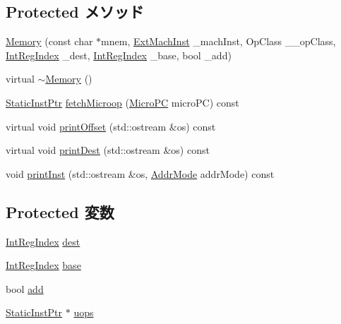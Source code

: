 \subsection*{Protected メソッド}
\begin{DoxyCompactItemize}
\item 
\hyperlink{classArmISA_1_1Memory_afe107d6d2ae3ba3d801594034a8b25ca}{Memory} (const char $\ast$mnem, \hyperlink{classStaticInst_a5605d4fc727eae9e595325c90c0ec108}{ExtMachInst} \_\-machInst, OpClass \_\-\_\-opClass, \hyperlink{namespaceArmISA_ae64680ba9fb526106829d6bf92fc791b}{IntRegIndex} \_\-dest, \hyperlink{namespaceArmISA_ae64680ba9fb526106829d6bf92fc791b}{IntRegIndex} \_\-base, bool \_\-add)
\item 
virtual \hyperlink{classArmISA_1_1Memory_a9c1fdd45550b31acf896fea338961fc1}{$\sim$Memory} ()
\item 
\hyperlink{classRefCountingPtr}{StaticInstPtr} \hyperlink{classArmISA_1_1Memory_ae9e7acd6304ee397f1ab470e283ae76b}{fetchMicroop} (\hyperlink{base_2types_8hh_adfb4d8b20c5abc8be73dd367b16f2d57}{MicroPC} microPC) const 
\item 
virtual void \hyperlink{classArmISA_1_1Memory_a8ff7c6b5299bfe7b627754684ca9c387}{printOffset} (std::ostream \&os) const 
\item 
virtual void \hyperlink{classArmISA_1_1Memory_a9a9365f7ef96d4838529320970308a57}{printDest} (std::ostream \&os) const 
\item 
void \hyperlink{classArmISA_1_1Memory_aa54b7cb19956c78633c70dfaf60bcf7d}{printInst} (std::ostream \&os, \hyperlink{classArmISA_1_1Memory_abf132b4ad93f3557cd3956577592ba68}{AddrMode} addrMode) const 
\end{DoxyCompactItemize}
\subsection*{Protected 変数}
\begin{DoxyCompactItemize}
\item 
\hyperlink{namespaceArmISA_ae64680ba9fb526106829d6bf92fc791b}{IntRegIndex} \hyperlink{classArmISA_1_1Memory_aec72e8e45bdc87abeeeb75d2a8a9a716}{dest}
\item 
\hyperlink{namespaceArmISA_ae64680ba9fb526106829d6bf92fc791b}{IntRegIndex} \hyperlink{classArmISA_1_1Memory_ad7a926fdfe0820284d654e9139a423b2}{base}
\item 
bool \hyperlink{classArmISA_1_1Memory_a077c453ada855fb73d907256d5e96465}{add}
\item 
\hyperlink{classRefCountingPtr}{StaticInstPtr} $\ast$ \hyperlink{classArmISA_1_1Memory_a4b95b3465f3133312f95fdaf25b90b36}{uops}
\end{DoxyCompactItemize}

